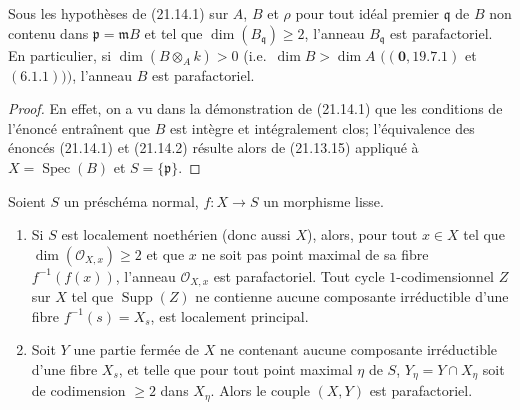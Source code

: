 \begin{corollary}[21.14.2]
\label{IV.21.14.2}
Sous les hypothèses de \textup{(21.14.1)} sur $A$, $B$ et $\rho$ pour tout idéal premier
$\mathfrak q$ de $B$ non contenu dans $\mathfrak p=\mathfrak mB$ et tel que
$\dim(B_\mathfrak q)\geq2$, l'anneau $B_\mathfrak q$ est parafactoriel. En
particulier, si $\dim(B\otimes_A k)>0$ \textup{(}i.e.\ $\dim B>\dim A$
$((\mathbf 0, 19.7.1)$ et $(6.1.1)))$, l'anneau $B$ est parafactoriel.
\end{corollary}

\begin{proof}
En effet, on a vu dans la démonstration de (21.14.1) que les conditions de l'énoncé
entraînent que $B$ est intègre et intégralement clos; l'équivalence des énoncés
(21.14.1) et (21.14.2) résulte alors de (21.13.15) appliqué à
$X=\operatorname{Spec}(B)$ et $S=\{\mathfrak p\}$.
\end{proof}

\begin{proposition}[21.14.3]
\label{IV.21.14.3}
Soient $S$ un préschéma normal, $f:X\to S$ un morphisme lisse.
\begin{enumerate}[label=\textup{(\roman*)}]
  \item Si $S$ est localement noethérien \textup{(}donc aussi $X$\textup{)}, alors, pour tout $x\in X$
  tel que $\dim(\mathcal O_{X,x})\geq2$ et que $x$ ne soit pas point maximal de sa
  fibre $f^{-1}(f(x))$, l'anneau $\mathcal O_{X,x}$ est parafactoriel. Tout cycle
  $1$-codimensionnel $Z$ sur $X$ tel que $\operatorname{Supp}(Z)$ ne contienne aucune
  composante irréductible d'une fibre $f^{-1}(s)=X_s$, est localement principal.
  \item Soit $Y$ une partie fermée de $X$ ne contenant aucune composante irréductible
  d'une fibre $X_s$, et telle que pour tout point maximal $\eta$ de $S$,
  $Y_\eta=Y\cap X_\eta$ soit de codimension $\geq2$ dans $X_\eta$. Alors le couple
  $(X,Y)$ est parafactoriel.
\end{enumerate}
\end{proposition}

